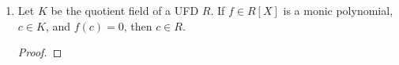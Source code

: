 \documentclass[../psets.tex]{subfiles}
\begin{document}
\begin{enumerate}
\begin{enumerate}
\begin{proof}
            Consider the evaluation homomorphism $\ev_q:\Z[X]\to\Z$. Since every integer $z\in\Z$ is an element of $\Z[X]$, $\ev_q$ is surjective. It follows by Exercise 7.3.24(b) of \textcite{bib:DummitFoote} (proven in HW2) that $\ev_q$ sends ideals to ideals. Thus, under $\ev_q$,
            \begin{align*}
                (X^m-1,X^n-1) &\mapsto (q^n-1,q^m-1)&
                (X^d-1) &\mapsto (q^d-1)
            \end{align*}
            It follows since $(X^m-1,X^n-1)=(X^d-1)$ as per part (i) that $(q^n-1,q^m-1)=(q^d-1)$, and hence $\gcd(q^m-1,q^n-1)=(q^d-1)$, as desired.
        \end{proof}
    \end{enumerate}
    \item Let $K$ be the quotient field of a UFD $R$. If $f\in R[X]$ is a monic polynomial, $c\in K$, and $f(c)=0$, then $c\in R$.
    \begin{proof}




\end{proof}
\end{enumerate}
\end{document}
